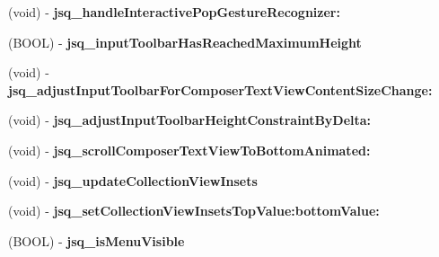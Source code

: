 \begin{DoxyCompactItemize}
\item 
\hypertarget{category_j_s_q_messages_view_controller_07_08_aca786f9a14481f82374caed3ab9871b7}{}(void) -\/ {\bfseries jsq\+\_\+handle\+Interactive\+Pop\+Gesture\+Recognizer\+:}\label{category_j_s_q_messages_view_controller_07_08_aca786f9a14481f82374caed3ab9871b7}

\item 
\hypertarget{category_j_s_q_messages_view_controller_07_08_a4fe60c6668b72cdef3b5125307555efb}{}(B\+O\+O\+L) -\/ {\bfseries jsq\+\_\+input\+Toolbar\+Has\+Reached\+Maximum\+Height}\label{category_j_s_q_messages_view_controller_07_08_a4fe60c6668b72cdef3b5125307555efb}

\item 
\hypertarget{category_j_s_q_messages_view_controller_07_08_a8ab2de3bcf3893c901f195f21fe2db56}{}(void) -\/ {\bfseries jsq\+\_\+adjust\+Input\+Toolbar\+For\+Composer\+Text\+View\+Content\+Size\+Change\+:}\label{category_j_s_q_messages_view_controller_07_08_a8ab2de3bcf3893c901f195f21fe2db56}

\item 
\hypertarget{category_j_s_q_messages_view_controller_07_08_ab35b37269a2e5348e22bd5faebbe8e03}{}(void) -\/ {\bfseries jsq\+\_\+adjust\+Input\+Toolbar\+Height\+Constraint\+By\+Delta\+:}\label{category_j_s_q_messages_view_controller_07_08_ab35b37269a2e5348e22bd5faebbe8e03}

\item 
\hypertarget{category_j_s_q_messages_view_controller_07_08_a6cb882fe328f3d26adcf8ce43dc25050}{}(void) -\/ {\bfseries jsq\+\_\+scroll\+Composer\+Text\+View\+To\+Bottom\+Animated\+:}\label{category_j_s_q_messages_view_controller_07_08_a6cb882fe328f3d26adcf8ce43dc25050}

\item 
\hypertarget{category_j_s_q_messages_view_controller_07_08_a15dbdc1749d1a53f75b2ef0e3c1ab79e}{}(void) -\/ {\bfseries jsq\+\_\+update\+Collection\+View\+Insets}\label{category_j_s_q_messages_view_controller_07_08_a15dbdc1749d1a53f75b2ef0e3c1ab79e}

\item 
\hypertarget{category_j_s_q_messages_view_controller_07_08_a381c3c96630cab898eb6587532c6558b}{}(void) -\/ {\bfseries jsq\+\_\+set\+Collection\+View\+Insets\+Top\+Value\+:bottom\+Value\+:}\label{category_j_s_q_messages_view_controller_07_08_a381c3c96630cab898eb6587532c6558b}

\item 
\hypertarget{category_j_s_q_messages_view_controller_07_08_ad449f53b922ab8e7c3bf94b963e45d4e}{}(B\+O\+O\+L) -\/ {\bfseries jsq\+\_\+is\+Menu\+Visible}\label{category_j_s_q_messages_view_controller_07_08_ad449f53b922ab8e7c3bf94b963e45d4e}


\end{DoxyCompactItemize}

